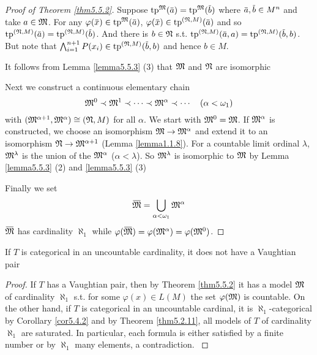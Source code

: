 \documentclass[11pt]{article}
\begin{document}
\begin{proof}[Proof of Theorem \ref{thm5.5.2}]
{Suppose \(\tp^{\fM}(\bara)=\tp^{\fM}(\barb)\) where \(\bara,\barb\in M^n\) and take \(a\in\mathfrak{M}\). For
any \(\varphi(\barx)\in\tp^{\fM}(\bara)\), \(\varphi(\barx)\in\tp^{(\fN,M)}(\bara)\) and
so \(\tp^{(\fN,M)}(\bara)=\tp^{(\fN,M)}(\barb)\). And there is \(b\in\mathfrak{N}\)
s.t. \(\tp^{(\fN,M)}(\bara,a)=\tp^{(\fN,M)}(\barb,b)\). But note
that \(\bigwedge_{i=1}^{n+1}P(x_i)\in\tp^{(\fN,M)}(\barb,b)\) and hence \(b\in M\).
}

It follows from Lemma \ref{lemma5.5.3} (3) that \(\mathfrak{M}\) and \(\mathfrak{N}\) are isomorphic

Next we construct a continuous elementary chain
\begin{equation*}
\mathfrak{M}^0\prec\mathfrak{M}^1\prec\cdots\prec\mathfrak{M}^\alpha\prec\cdots\quad(\alpha<\omega_1)
\end{equation*}
with \((\mathfrak{M}^{\alpha+1},\mathfrak{M}^\alpha)\cong(\mathfrak{N},M)\) for all \(\alpha\). We start with \(\mathfrak{M}^0=\mathfrak{M}\). If \(\mathfrak{M}^\alpha\) is constructed, we
choose an isomorphism \(\mathfrak{M}\to\mathfrak{M}^\alpha\) and extend it to an isomorphism \(\mathfrak{N}\to\mathfrak{M}^{\alpha+1}\) (Lemma
\ref{lemma1.1.8}). For a countable limit ordinal \(\lambda\), \(\mathfrak{M}^\lambda\) is the union of the \(\mathfrak{M}^\alpha\) (\(\alpha<\lambda\)).
So \(\mathfrak{M}^\lambda\) is isomorphic to \(\mathfrak{M}\) by Lemma \ref{lemma5.5.3} (2) and \ref{lemma5.5.3} (3)

Finally we set
\begin{equation*}
\barfM=\bigcup_{\alpha<\omega_1}\fM^\alpha
\end{equation*}
\(\barfM\) has cardinality \(\aleph_1\) while \(\varphi(\barfM)=\varphi(\fM^\alpha)=\varphi(\fM^0)\).
\end{proof}

\begin{corollary}[]
\label{cor5.5.4}
If \(T\) is categorical in an uncountable cardinality, it does not have a Vaughtian pair
\end{corollary}

\begin{proof}
If \(T\) has a Vaughtian pair, then by Theorem \ref{thm5.5.2} it has a model \(\mathfrak{M}\) of
cardinality \(\aleph_1\) s.t. for some \(\varphi(x)\in L(M)\) the set \(\varphi(\mathfrak{M})\) is countable. On the other
hand, if \(T\) is categorical in an uncountable cardinal, it is \(\aleph_1\)-categorical by Corollary
\ref{cor5.4.2} and by Theorem \ref{thm5.2.11}, all models of \(T\) of cardinality \(\aleph_1\) are
saturated. In particular, each formula is either satisfied by a finite number or by \(\aleph_1\) many
elements, a contradiction. \label{Problem2}
\end{proof}
\end{document}
